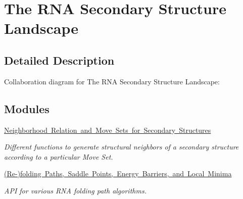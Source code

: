\hypertarget{group__landscape}{}\section{The R\+NA Secondary Structure Landscape}
\label{group__landscape}


\subsection{Detailed Description}
Collaboration diagram for The R\+NA Secondary Structure Landscape\+:
\subsection*{Modules}
\begin{DoxyCompactItemize}
\item 
\mbox{\hyperlink{group__neighbors}{Neighborhood Relation and Move Sets for Secondary Structures}}
\begin{DoxyCompactList}\small\item\em Different functions to generate structural neighbors of a secondary structure according to a particular Move Set. \end{DoxyCompactList}\item 
\mbox{\hyperlink{group__paths}{(\+Re-\/)folding Paths, Saddle Points, Energy Barriers, and Local Minima}}
\begin{DoxyCompactList}\small\item\em A\+PI for various R\+NA folding path algorithms. \end{DoxyCompactList}\end{DoxyCompactItemize}
